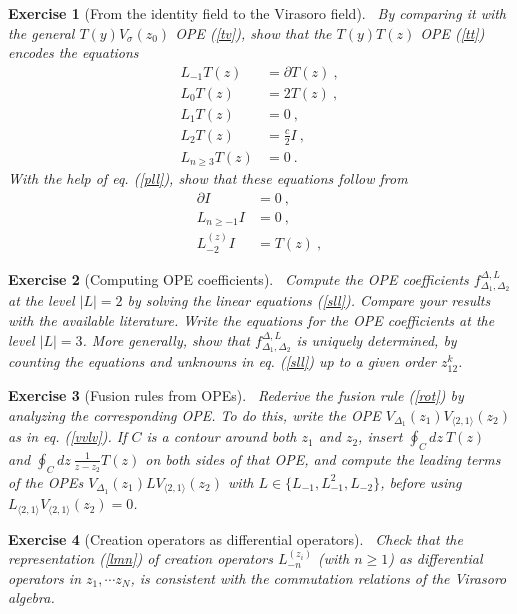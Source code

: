 \documentclass[12pt,a4paper,notitlepage]{report}
\newcommand \p {\partial}
\numberwithin{equation}{section}
\theoremstyle{break}
\newtheorem{exo}{Exercise}[chapter]
\begin{document}
\begin{exo}[From the identity field to the Virasoro field]
 ~\label{exoit}
By comparing it with the general $T(y)V_\sigma(z_0)$ OPE (\ref{tv}), show that the $T(y)T(z)$ OPE (\ref{tt}) encodes the equations
\begin{align}
 L_{-1}T(z) &= \p T(z) \ ,
\label{lmt}
\\
L_0 T(z) &= 2 T(z)\ ,
\\
L_1 T(z) &= 0 \ ,
\\
L_2 T(z) &= \frac{c}{2} I\ ,
\\
L_{n\geq 3} T(z) &= 0 \ .
\label{lgt}
\end{align}
With the help of eq. (\ref{pll}), show that these equations follow from 
\begin{align}
 \p I & = 0\ ,
\label{piz}
\\
 L_{n\geq -1} I& = 0\ ,
\\
L_{-2}^{(z)}I & = T(z)\ ,
\label{let}
\end{align}
\end{exo}

\begin{exo}[Computing OPE coefficients]
 ~\label{exohf}
Compute the OPE coefficients $f^{\Delta,L}_{\Delta_1,\Delta_2}$ at the level $|L|= 2$ by solving the linear equations (\ref{sll}). Compare your results with the available literature. Write the equations for the OPE coefficients at the level $|L|=3$. 
More generally, show that $f^{\Delta,L}_{\Delta_1,\Delta_2}$ is uniquely determined, 
by counting the equations and unknowns in eq. (\ref{sll}) up to a given order $z_{12}^k$.
\end{exo}

\begin{exo}[Fusion rules from OPEs]
 ~\label{exooit}
Rederive the fusion rule (\ref{rot}) by analyzing the corresponding OPE. To do this, write the OPE $V_{\Delta_1}(z_1)V_{\langle 2,1 \rangle}(z_2)$ as in eq. (\ref{vvlv}). If $C$ is a contour around both $z_1$ and $z_2$, insert $\oint_C dz\ T(z)$ and $\oint_C dz\ \frac{1}{z-z_2}T(z)$ on both sides of that OPE, and compute the leading terms of the OPEs $V_{\Delta_1}(z_1) LV_{\langle 2,1 \rangle}(z_2)$ with $L\in\{L_{-1},L_{-1}^2,L_{-2}\}$, before using $L_{\langle 2,1 \rangle} V_{\langle 2,1 \rangle} (z_2) =0$. 
\end{exo}

\begin{exo}[Creation operators as differential operators]
 ~\label{exodma}
 Check that the representation (\ref{lmn}) of creation operators $L_{-n}^{(z_i)}$ (with $n\geq 1$) as differential operators in $z_1,\cdots z_N$, is consistent with the commutation relations of the Virasoro algebra. 
\end{exo}
\end{document}
